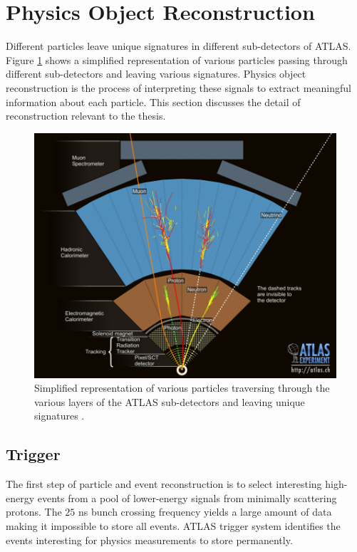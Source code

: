 \section{ Physics Object Reconstruction} 
\label{sec:ParticleReconstruction}
Different particles leave unique signatures in different sub-detectors of ATLAS. Figure \ref{fig:ATLASTransverse} shows a simplified representation of various particles passing through different sub-detectors and leaving various signatures. Physics object reconstruction is the process of interpreting these signals to extract meaningful information about each particle. This section discusses the detail of reconstruction relevant to the thesis. 

\begin{figure}[!htb]
    \centering
    \includegraphics[width=.98\linewidth]{figures/LHC/ATLAS_Transverse.jpg}
    \caption{ Simplified representation of various particles traversing through the various layers of the ATLAS sub-detectors and leaving unique signatures \cite{ATLASTransverse}.\label{fig:ATLASTransverse}}
\end{figure}

\subsection{Trigger}
\label{subsec:TriggerATLAS}
The first step of particle and event reconstruction is to select interesting high-energy events from a pool of lower-energy signals from minimally scattering protons. The $25$ ns bunch crossing frequency yields a large amount of data making it impossible to store all events. ATLAS trigger system identifies the events interesting for physics measurements to store permanently. 

